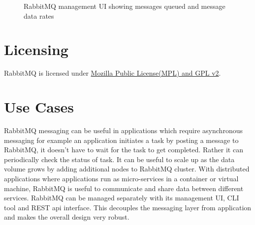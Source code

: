 \documentclass[9pt,twocolumn,twoside]{styles/osajnl}
\begin{document}
\begin{figure}[htbp]
\centering
{}
\caption{RabbitMQ management UI showing messages queued and message data rates}\cite{www-rabbitmq-Johan}
\label{fig:false-color}
\end{figure}

\section{Licensing}
RabbitMQ is licensed under \href{https://www.rabbitmq.com/mpl.html} {Mozilla Public License(MPL) and GPL v2}. \cite{www-rabbitmq-pivotal}

\section{Use Cases}

RabbitMQ messaging can be useful in applications which require asynchronous messaging for example an application initiates a task by posting a message to RabbitMQ, it doesn't have to wait for the task to get completed. Rather it can periodically check the status of task. It can be useful to scale up as the data volume grows by adding additional nodes to RabbitMQ cluster. With distributed applications where applications run as micro-services in a container or virtual machine, RabbitMQ is useful to communicate and share data between different services. RabbitMQ can be managed separately with its management UI, CLI tool and REST api interface. This decouples the messaging layer from application and makes the overall design very robust. 
\end{document}
